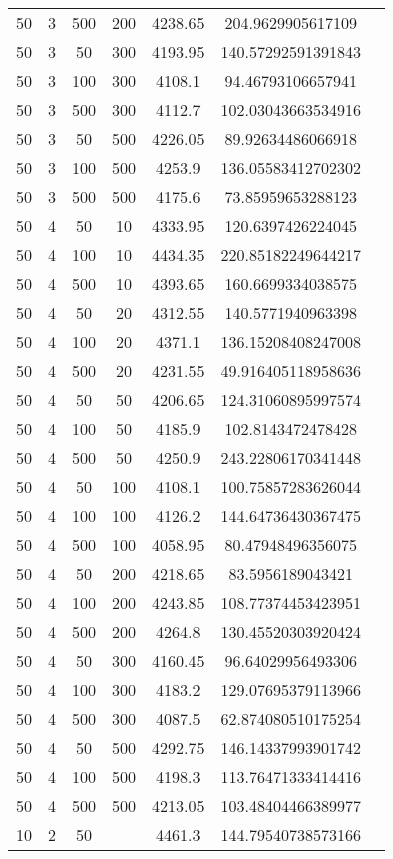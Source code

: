 {\begin{longtabu}{S
S
S
S
S
S[round-mode=places,round-precision=0]
S[round-mode=places,round-precision=0]}
50 & 3 & 500 & 200 & 4238.65 & 204.9629905617109 \\
50 & 3 & 50 & 300 & 4193.95 & 140.57292591391843 \\
50 & 3 & 100 & 300 & 4108.1 & 94.46793106657941 \\
50 & 3 & 500 & 300 & 4112.7 & 102.03043663534916 \\
50 & 3 & 50 & 500 & 4226.05 & 89.92634486066918 \\
50 & 3 & 100 & 500 & 4253.9 & 136.05583412702302 \\
50 & 3 & 500 & 500 & 4175.6 & 73.85959653288123 \\
50 & 4 & 50 & 10 & 4333.95 & 120.6397426224045 \\
50 & 4 & 100 & 10 & 4434.35 & 220.85182249644217 \\
50 & 4 & 500 & 10 & 4393.65 & 160.6699334038575 \\
50 & 4 & 50 & 20 & 4312.55 & 140.5771940963398 \\
50 & 4 & 100 & 20 & 4371.1 & 136.15208408247008 \\
50 & 4 & 500 & 20 & 4231.55 & 49.916405118958636 \\
50 & 4 & 50 & 50 & 4206.65 & 124.31060895997574 \\
50 & 4 & 100 & 50 & 4185.9 & 102.8143472478428 \\
50 & 4 & 500 & 50 & 4250.9 & 243.22806170341448 \\
50 & 4 & 50 & 100 & 4108.1 & 100.75857283626044 \\
50 & 4 & 100 & 100 & 4126.2 & 144.64736430367475 \\
50 & 4 & 500 & 100 & 4058.95 & 80.47948496356075 \\
50 & 4 & 50 & 200 & 4218.65 & 83.5956189043421 \\
50 & 4 & 100 & 200 & 4243.85 & 108.77374453423951 \\
50 & 4 & 500 & 200 & 4264.8 & 130.45520303920424 \\
50 & 4 & 50 & 300 & 4160.45 & 96.64029956493306 \\
50 & 4 & 100 & 300 & 4183.2 & 129.07695379113966 \\
50 & 4 & 500 & 300 & 4087.5 & 62.874080510175254 \\
50 & 4 & 50 & 500 & 4292.75 & 146.14337993901742 \\
50 & 4 & 100 & 500 & 4198.3 & 113.76471333414416 \\
50 & 4 & 500 & 500 & 4213.05 & 103.48404466389977 \\
10 & 2 & 50 & & 4461.3 & 144.79540738573166 \\

\end{longtabu}}
